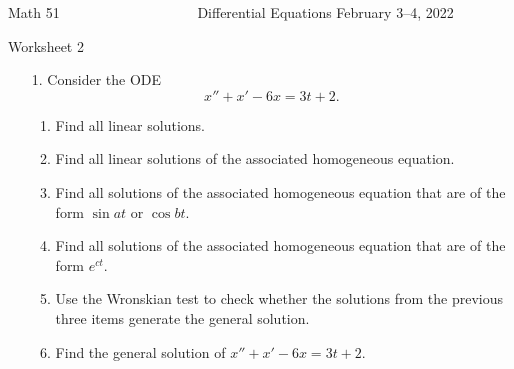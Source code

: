\documentclass[12pt]{article}
\begin{document}

\noindent
Math 51~~~~~~~~~~~~~~~~~~~ \hfill Differential Equations \hfill February 3--4, 2022 
 \centerline{Worksheet 2}

\begin{enumerate}
\item[1.] 
Consider the ODE   
\[
x''+x'-6x=3t+2.
\]
\begin{enumerate}
\item Find all linear solutions.
  \vfil
\item Find all linear solutions of the associated homogeneous equation.
  \vfil  
\item Find all solutions of the associated homogeneous equation that are of
  the form \(\sin at\) or \(\cos bt\).
  \vfil  
\item Find all solutions of the associated homogeneous equation that are of
  the form \(e^{ct}\).
  \vfil  
\item Use the Wronskian test to check whether the solutions from the
  previous three items generate the general solution.
  \vfil  
\item Find the general solution of  \(x''+x'-6x=3t+2\).
\end{enumerate}
\end{enumerate}
\end{document}
